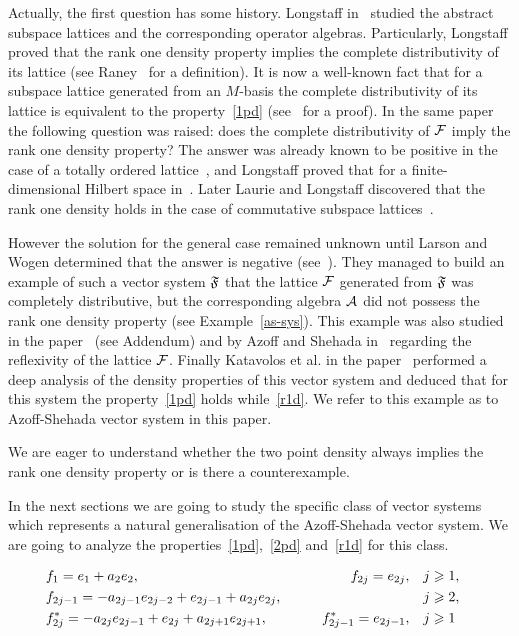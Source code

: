\documentclass[12pt]{amsart}
\begin{document}
  Actually, the first question has some history.
  Longstaff in~\cite{longstaff} studied the abstract subspace lattices and the corresponding operator algebras.
  Particularly, Longstaff proved that the rank one density property implies
    the complete distributivity of its lattice (see Raney~\cite{raney} for a definition).
  It is now a well-known fact that for a subspace lattice generated from an $M$-basis the complete distributivity of its lattice is equivalent to
    the property~\ref{1pd} (see~\cite{argyroslambrou} for a proof).
  In the same paper the following question was raised: does the complete distributivity of $\cal{F}$ imply the rank one density property?
  The answer was already known to be positive in the case of a totally ordered lattice~\cite{erdos}, and
    Longstaff proved that for a finite-dimensional Hilbert space in~\cite{longstaff}.
  Later Laurie and Longstaff discovered that the rank one density holds in the case of commutative subspace lattices~\cite{laurielongstaff}.

  However the solution for the general case remained unknown until Larson and Wogen determined that the answer is negative (see~\cite{larson}).
  They managed to build an example of such a vector system $\fsys$ that the lattice $\cal{F}$ generated from $\fsys$
    was completely distributive, but the corresponding algebra $\cal{A}$
    did not possess the rank one density property (see Example~\ref{as-sys}).
  This example was also studied in the paper~\cite{argyroslambrou} (see Addendum) and by Azoff and Shehada in~\cite{azoff} regarding
    the reflexivity of the lattice $\cal{F}$.
  Finally Katavolos et al. in the paper~\cite{katavolos} performed a deep analysis of the density properties of this vector system and
    deduced that for this system the property~\ref{1pd} holds while~\ref{r1d}.
  We refer to this example as to Azoff-Shehada vector system in this paper.

  We are eager to understand whether the two point density always implies the rank one density property or is there a counterexample.

  In the next sections we are going to study the specific class of vector systems which represents a natural generalisation of
    the Azoff-Shehada vector system.
  We are going to analyze the properties~\ref{1pd},~\ref{2pd} and~\ref{r1d} for this class.
  \begin{example}
    \label{as-sys}
    \begin{align*}
      &f_1 = e_1 + a_2 e_2, \qquad &f_{2j}=e_{2j}, \quad&j \geq 1,&\\
      &f_{2j-1}=-a_{2j-1}e_{2j-2} + e_{2j-1} + a_{2j}e_{2j}, \qquad &\makebox[5em]{} \quad&j \geq 2,&\\
      &f^*_{2j}=-a_{2j}e_{2j-1}+e_{2j}+a_{2j+1}e_{2j+1}, \qquad &f^*_{2j-1}=e_{2j-1}, \quad&j \geq 1&
    \end{align*}
  \end{example}
\end{document}
